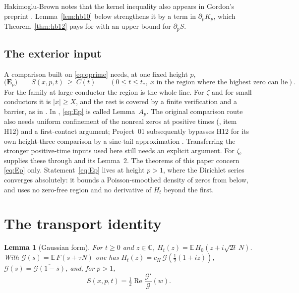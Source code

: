 \documentclass[11pt]{article}
\newtheorem{lemma}[theorem]{Lemma}
\theoremstyle{definition}
\theoremstyle{remark}
\newcommand{\C}{\mathbb C}
\newcommand{\E}{\mathbb E}
\newcommand{\cG}{\mathcal G}
\newcommand{\re}{\operatorname{Re}}
\numberwithin{equation}{section}
\begin{document}
Hakimoglu-Brown notes that the kernel inequality also appears in Gordon's
preprint \cite[Section~5]{gordon}. Lemma~\ref{lem:hb10} below strengthens
it by a term in $\partial_pK_p$, which Theorem~\ref{thm:hb12} pays for with
an upper bound for $\partial_pS$.

\subsection{The exterior input}\label{sec:exterior}

A comparison built on \eqref{eq:qprime} needs, at one fixed height $p$,
\begin{equation}\label{eq:Ep}
\textbf{(E$_p$)}\qquad S(x,p,t)\ \ge\ C(t)\qquad(0\le t\le t_*,\ x\text{ in the region where the highest zero can lie}).
\end{equation}
For the family at large conductor the region is the whole line. For $\zeta$
and for small conductors it is $\lvert x\rvert\ge X$, and the rest is
covered by a finite verification and a barrier, as in
\cite[Lemma~2]{hb}. In \cite{p01}, \eqref{eq:Ep} is called Lemma~$A_p$. The
original comparison route also needs uniform confinement of the nonreal
zeros at positive times (\cite{p01}, item H12) and a first-contact argument;
Project~01 subsequently bypasses H12 for its own height-three comparison
by a sine-tail approximation \cite{p01r3}. Transferring the stronger
positive-time inputs used here still needs an explicit argument. For $\zeta$,
\cite{hb} supplies these through \cite[Theorem~1.5]{polymath} and its
Lemma~2. The theorems of this paper concern \eqref{eq:Ep} only.
Statement~\eqref{eq:Ep} lives at height $p>1$, where the Dirichlet series
converges absolutely: it bounds a Poisson-smoothed density of zeros from
below, and uses no zero-free region and no derivative of $H_t$ beyond the
first.

\section{The transport identity}\label{sec:saddle}

\begin{lemma}[Gaussian form]\label{lem:gauss}
For $t\ge0$ and $z\in\C$, $H_t(z)=\E\,H_0(z+i\sqrt{2t}\,N)$. With
$\cG(s)=\E\,F(s+\tau N)$ one has $H_t(z)=c_H\,\cG(\frac12(1+iz))$,
$\cG(s)=\overline{\cG(1-\bar s)}$, and, for $p>1$,
\[
S(x,p,t)=\tfrac12\re\frac{\cG'}{\cG}(w).
\]
\end{lemma}
\end{document}
